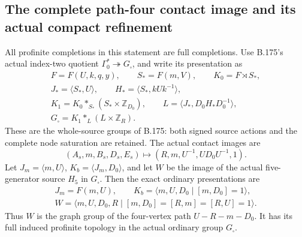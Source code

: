 \subsection*{The complete path-four contact image and its actual compact refinement}
\label{stmt:B177}
All profinite completions in this statement are full completions.
Use B.175's actual index-two quotient
\(\Gamma_0^*\twoheadrightarrow G_\square\), and write its presentation as
\begin{equation}\label{eq:B177-target}
\begin{gathered}
 F=F(U,k,q,y),\qquad S_*=F(m,V),\qquad K_0=F\rtimes S_*,\\
 J_*=\langle S_*,U\rangle,\qquad
 H_*=\langle S_*,kUk^{-1}\rangle,\\
 K_1=K_0*_{S_*}(S_*\times\mathbb Z_{D_0}),\qquad
 L=\langle J_*,D_0H_*D_0^{-1}\rangle,\\
 G_\square=K_1*_{L}(L\times\mathbb Z_R).
\end{gathered}
\end{equation}
These are the whole-source groups of B.175: both signed source actions
and the complete node saturation are retained. The actual contact
images are
\begin{equation}\label{eq:B177-marking}
 (A_s,m,B_s,D_s,E_s)
       \longmapsto(R,m,U^{-1},UD_0U^{-1},1).
\end{equation}
Let \(J_m=\langle m,U\rangle\), \(K_b=\langle J_m,D_0\rangle\),
and let \(W\) be the image of the actual five-generator source
\(H_5\) in \(G_\square\). Then the exact ordinary presentations are
\begin{equation}\label{eq:B177-ordinary}
\begin{gathered}
 J_m=F(m,U),\qquad
 K_b=\langle m,U,D_0\mid[m,D_0]=1\rangle,\\
 W=\langle m,U,D_0,R\mid[m,D_0]=[R,m]=[R,U]=1\rangle.
\end{gathered}
\end{equation}
Thus \(W\) is the graph group of the four-vertex path
\(U\!-
 R\!-
 m\!-
 D_0\). It has its full induced profinite topology in
the actual ordinary group \(G_\square\).

